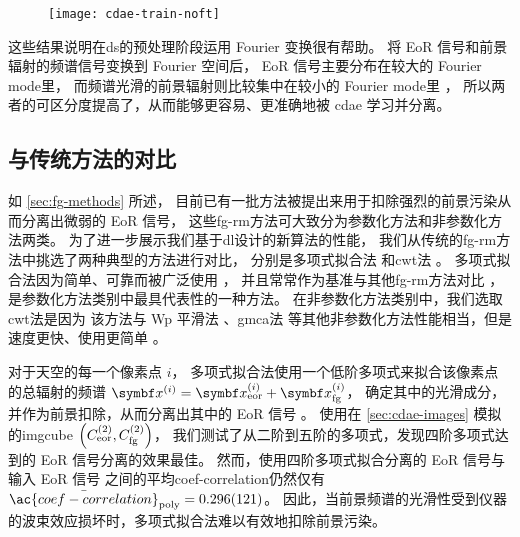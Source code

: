 \begin{figure}[htp]
  \centering
  \texttt{[image: cdae-train-noft]}
  \label{fig:cdae-train-noft}
\end{figure}

这些结果说明在\ac{ds}的预处理阶段运用 Fourier 变换很有帮助。
将 EoR 信号和前景辐射的频谱信号变换到 Fourier 空间后，
EoR 信号主要分布在较大的 Fourier \ac{mode}里，
而频谱光滑的前景辐射则比较集中在较小的 Fourier \ac{mode}里 \cite{parsons2012}，
所以两者的可区分度提高了，从而能够更容易、更准确地被 \ac{cdae} 学习并分离。

\subsection{与传统方法的对比}

如 \autoref{sec:fg-methods} 所述，
目前已有一批方法被提出来用于扣除强烈的前景污染从而分离出微弱的 EoR 信号，
这些\ac{fg-rm}方法可大致分为参数化方法和非参数化方法两类。
为了进一步展示我们基于\ac{dl}设计的新算法的性能，
我们从传统的\ac{fg-rm}方法中挑选了两种典型的方法进行对比，
分别是多项式拟合法\cite{wang2006} 和\ac{cwt}法 \cite{gu2013}。
多项式拟合法因为简单、可靠而被广泛使用 \cite{jelic2008,liu2009ps,pritchard2010}，
并且常常作为基准与其他\ac{fg-rm}方法对比 \cite{harker2009,alonso2015,chapman2015}，
是参数化方法类别中最具代表性的一种方法。
在非参数化方法类别中，我们选取\ac{cwt}法是因为
该方法与 Wp 平滑法 \cite{harker2009}、\ac{gmca}法 \cite{chapman2013}
等其他非参数化方法性能相当，但是速度更快、使用更简单 \cite{gu2013,chapman2015}。

对于天空的每一个像素点 $i$，
多项式拟合法使用一个低阶多项式来拟合该像素点的总辐射的频谱
$\B{x}^{(i)} = \B{x}^{(i)}_{\R{eor}} + \B{x}^{(i)}_{\R{fg}}$，
确定其中的光滑成分，并作为前景扣除，从而分离出其中的 EoR 信号 \cite{wang2006}。
使用在 \autoref{sec:cdae-images} 模拟的\ac{imgcube}
$\left( C_{\mathrm{eor}}^{(2)}, C_{\mathrm{fg}}^{(2)} \right)$，
我们测试了从二阶到五阶的多项式，发现四阶多项式达到的 EoR 信号分离的效果最佳。
然而，使用四阶多项式拟合分离的 EoR 信号与输入 EoR 信号
之间的平均\acl{coef-correlation}仍然仅有
$\bar{\ac{coef-correlation}}_{\R{poly}} = \num{0.296 +- 0.121}$。
因此，当前景频谱的光滑性受到仪器的波束效应损坏时，多项式拟合法难以有效地扣除前景污染。

